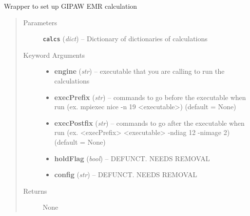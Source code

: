 \documentclass[letterpaper,10pt,english]{sphinxmanual}
\begin{document}
\begin{fulllineitems}
\label{run:run.emr}
Wrapper to set up GIPAW EMR calculation
\begin{quote}\begin{description}
\item[{Parameters}] \leavevmode
\textbf{\texttt{calcs}} (\emph{dict}) -- Dictionary of dictionaries of calculations

\item[{Keyword Arguments}] \leavevmode\begin{itemize}
\item {} 
\textbf{engine} (\emph{str}) --
executable that you are calling to run the calculations

\item {} 
\textbf{execPrefix} (\emph{str}) --
commands to go before the executable when run
(ex. mpiexec nice -n 19 \textless{}executable\textgreater{}) (default = None)

\item {} 
\textbf{execPostfix} (\emph{str}) --
commands to go after the executable when run
(ex. \textless{}execPrefix\textgreater{} \textless{}executable\textgreater{} -ndiag 12 -nimage 2) (default = None)

\item {} 
\textbf{holdFlag} (\emph{bool}) --
DEFUNCT. NEEDS REMOVAL

\item {} 
\textbf{config} (\emph{str}) --
DEFUNCT. NEEDS REMOVAL

\end{itemize}

\item[{Returns}] \leavevmode
None

\end{description}\end{quote}

\end{fulllineitems}

\end{document}
